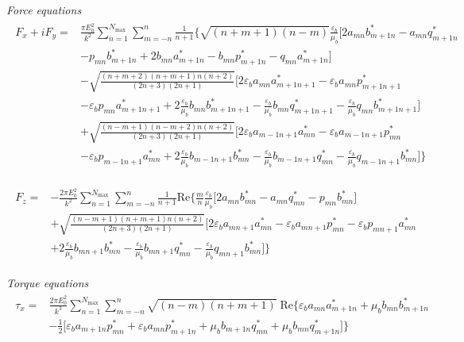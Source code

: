 \documentclass[11pt]{article}
\begin{document}
\emph{Force equations}
\begin{align}
\begin{split}
    F_x + iF_y =& \frac{\pi E_0^2}{k^2} \sum_{n=1}^{N_\text{max}} \sum_{m=-n}^{n} \frac{1}{n+1}\bigg\{
          \sqrt{(n+m+1)(n-m)}\frac{\varepsilon_b}{\mu_b}
          \bigg[2a_{mn}b_{m+1n}^*  - a_{mn}q_{m+1n}^* \\ 
        & - p_{mn} b_{m+1n}^* + 2b_{mn}a_{m+1n}^* - b_{mn}p_{m+1n}^* - q_{mn}a_{m+1n}^*  \bigg] \\
        & - \sqrt{\frac{(n+m+2)(n+m+1)n(n+2)}{(2n+3)(2n+1)}}
        \bigg[ 2 \varepsilon_b a_{mn}a_{m+1n+1}^* - \varepsilon_b a_{mn}p_{m+1n+1}^* \\
        & - \varepsilon_b p_{mn}a_{m+1n+1}^* + 2 \frac{\varepsilon_b}{\mu_b} b_{mn}b_{m+1n+1}^* - \frac{\varepsilon_b}{\mu_b} b_{mn}q_{m+1n+1}^* - \frac{\varepsilon_b}{\mu_b} q_{mn}b_{m+1n+1}^*\bigg] \\
        & + \sqrt{\frac{(n-m+1)(n-m+2)n(n+2)}{(2n+3)(2n+1)}}
        \bigg[ 2 \varepsilon_b a_{m-1n+1}a_{mn}^* - \varepsilon_b a_{m-1n+1}p_{mn}^* \\
        & - \varepsilon_b p_{m-1n+1}a_{mn}^* + 2 \frac{\varepsilon_b}{\mu_b} b_{m-1n+1}b_{mn}^* - \frac{\varepsilon_b}{\mu_b} b_{m-1n+1}q_{mn}^* - \frac{\varepsilon_b}{\mu_b} q_{m-1n+1}b_{mn}^*\bigg]
        \bigg\}
\end{split}
\end{align}

\begin{align}
\begin{split}
    F_z =& -\frac{2\pi E_0^2}{k^2} \sum_{n=1}^{N_\text{max}} \sum_{m=-n}^{n} \frac{1}{n+1}\text{Re}\bigg\{
          \frac{m}{n} \frac{\varepsilon_b}{\mu_b}
          \bigg[ 2a_{mn}b_{mn}^* - a_{mn}q_{mn}^* - p_{mn}b_{mn}^* \bigg] \\
        & + \sqrt{\frac{(n-m+1)(n+m+1)n(n+2)}{(2n+3)(2n+1)}}
        \bigg[ 2 \varepsilon_b a_{mn+1}a_{mn}^* - \varepsilon_b a_{mn+1}p_{mn}^* - \varepsilon_b p_{mn+1}a_{mn}^* \\
        & + 2 \frac{\varepsilon_b}{\mu_b} b_{mn+1}b_{mn}^* - \frac{\varepsilon_b}{\mu_b} b_{mn+1}q_{mn}^* - \frac{\varepsilon_b}{\mu_b} q_{mn+1}b_{mn}^*
        \bigg] \bigg\}
\end{split}
\end{align}

\emph{Torque equations}
\begin{align}
\begin{split}
    \tau_x =& \frac{2\pi E_0^2}{k^3} \sum_{n=1}^{N_\text{max}} \sum_{m=-n}^{n} \sqrt{(n-m)(n+m+1)} \; \text{Re} \bigg\{
            \varepsilon_b a_{mn}a_{m+1n}^* + \mu_b b_{mn}b_{m+1n}^* \\
            & - \frac{1}{2} \bigg[ \varepsilon_b a_{m+1n}p_{mn}^* + \varepsilon_b a_{mn}p_{m+1n}^*
            + \mu_b b_{m+1n}q_{mn}^* + \mu_b b_{mn}q_{m+1n}^*\bigg] \bigg\}
\end{split}
\end{align}
\end{document}
